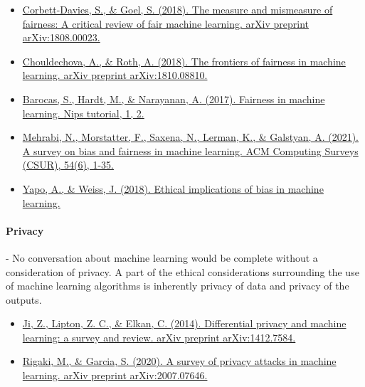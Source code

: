 \documentclass{article}
\begin{document}
\begin{itemize}
\item \href{https://arxiv.org/pdf/1808.00023.pdf }{Corbett-Davies, S., \& Goel, S. (2018). The measure and mismeasure of fairness: A critical review of fair machine learning. arXiv preprint arXiv:1808.00023.} \cite{corbett2018measure}
\item \href{https://arxiv.org/pdf/1810.08810.pdf }{Chouldechova, A., \& Roth, A. (2018). The frontiers of fairness in machine learning. arXiv preprint arXiv:1810.08810.} \cite{chouldechova2018frontiers}
\item \href{https://fairmlbook.org/pdf/fairmlbook.pdf}{Barocas, S., Hardt, M., \& Narayanan, A. (2017). Fairness in machine learning. Nips tutorial, 1, 2.} \cite{barocas2017fairness}
\item \href{https://arxiv.org/pdf/1908.09635.pdf}{Mehrabi, N., Morstatter, F., Saxena, N., Lerman, K., \& Galstyan, A. (2021). A survey on bias and fairness in machine learning. ACM Computing Surveys (CSUR), 54(6), 1-35.} 
\item \href{https://scholarspace.manoa.hawaii.edu/server/api/core/bitstreams/d062bd2a-df54-48d4-b27e-76d903b9caaa/content}{Yapo, A., \& Weiss, J. (2018). Ethical implications of bias in machine learning.} 
\end{itemize}

\paragraph{Privacy} - No conversation about machine learning would be complete without a consideration of privacy. A part of the ethical considerations surrounding the use of machine learning algorithms is inherently privacy of data and privacy of the outputs. 

\begin{itemize}
\item \href{https://arxiv.org/pdf/1412.7584.pdf }{Ji, Z., Lipton, Z. C., \& Elkan, C. (2014). Differential privacy and machine learning: a survey and review. arXiv preprint arXiv:1412.7584.} \cite{ji2014differential}
\item \href{https://arxiv.org/pdf/2007.07646.pdf}{Rigaki, M., \& Garcia, S. (2020). A survey of privacy attacks in machine learning. arXiv preprint arXiv:2007.07646.} \cite{rigaki2020survey}
\end{itemize}
\end{document}
